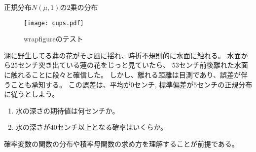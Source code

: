 \begin{問題}[やや難]{正規分布$N(\mu, 1)$の$2$乗の分布}
\begin{wrapfigure}[9]{l}{50mm} 
\centering
\texttt{[image: cups.pdf]}%
\caption{wrapfigureのテスト}
\end{wrapfigure}
湖に野生してる蓮の花がそよ風に揺れ、時折不規則的に水面に触れる。
水面から$25$センチ突き出ている蓮の花をじっと見ていたら、
$53$センチ前後離れた水面に触れることに段々と確信した。
しかし、離れる距離は目測であり、誤差が伴うことも承知する。
この誤差は、平均が$0$センチ, 標準偏差が$5$センチの正規分布に従うとしよう。
\begin{enumerate}
\item 水の深さの期待値は何センチか。
\item 水の深さが$40$センチ以上となる確率はいくらか。
\end{enumerate}
\end{問題}

確率変数の関数の分布や積率母関数の求め方を理解することが前提である。

